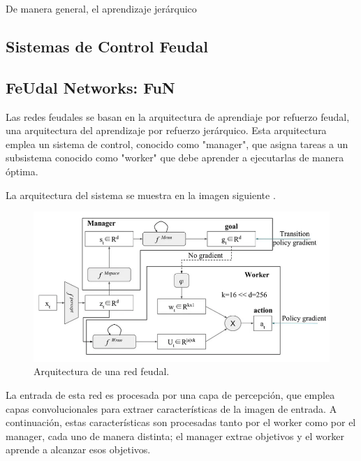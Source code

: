 \documentclass[letterpaper]{article} %
\begin{document}


De manera general, el aprendizaje jerárquico 

\subsection{Sistemas de Control Feudal}


\subsection{FeUdal Networks: FuN}

Las redes feudales se basan en la arquitectura de aprendiaje por refuerzo feudal, 
una arquitectura del aprendizaje por refuerzo jerárquico. Esta arquitectura emplea un sistema de control, conocido
como "manager", que asigna tareas a un subsistema conocido como "worker" que debe aprender a ejecutarlas de manera óptima.

La arquitectura del sistema se muestra en la imagen siguiente \cite{feudal_networks_2024}.

\begin{figure}[H]
    \centering
    \includegraphics[width=0.9\columnwidth]{feudal_arquitecture.png}
    \caption{Arquitectura de una red feudal.}
    \label{fig:arquitectura_feudal}
\end{figure}

La entrada de esta red es procesada por una capa de percepción, que emplea capas convolucionales
para extraer características de la imagen de entrada. A continuación, estas características son procesadas
tanto por el worker como por el manager, cada uno de manera distinta; el manager extrae objetivos y el worker
aprende a alcanzar esos objetivos.
\end{document}
